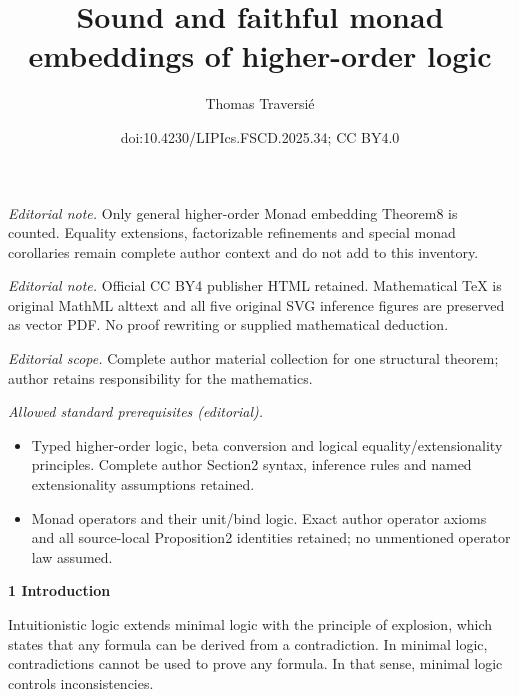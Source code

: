 \documentclass[10pt,a4paper]{article}
\title{Sound and faithful monad embeddings of higher-order logic}
\author{Thomas Traversié}
\date{doi:10.4230/LIPIcs.FSCD.2025.34; CC BY4.0}
\begin{document}
\maketitle
\noindent\textit{Editorial note.} Only general higher-order Monad embedding Theorem8 is counted. Equality extensions, factorizable refinements and special monad corollaries remain complete author context and do not add to this inventory.\par\medskip
\noindent\textit{Editorial note.} Official CC BY4 publisher HTML retained. Mathematical TeX is original MathML alttext and all five original SVG inference figures are preserved as vector PDF. No proof rewriting or supplied mathematical deduction.\par\medskip
\noindent\textit{Editorial scope.} Complete author material collection for one structural theorem; author retains responsibility for the mathematics.\par\medskip
\noindent\textit{Allowed standard prerequisites (editorial).}\begin{itemize}
\item Typed higher-order logic, beta conversion and logical equality/extensionality principles. Complete author Section2 syntax, inference rules and named extensionality assumptions retained.
\item Monad operators and their unit/bind logic. Exact author operator axioms and all source-local Proposition2 identities retained; no unmentioned operator law assumed.
\end{itemize}\medskip

 
\par\medskip\noindent\textbf{1 Introduction}\par
 
 
Intuitionistic logic extends minimal logic with the principle of explosion, which states that any formula can be derived from a contradiction. In minimal logic, contradictions cannot be used to prove any formula. In that sense, minimal logic controls inconsistencies.\par
 
\begin{center}\end{center}
 
\end{document}
